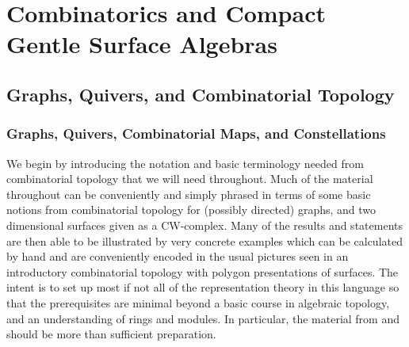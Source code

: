 \documentclass[11pt,oneside]{amsbook}
\numberwithin{equation}{section}
\theoremstyle{plain}
\theoremstyle{definition}
\theoremstyle{remark}
\newenvironment{fullwidth}{\par\noindent}{\par}
\begin{document}
	\begin{fullwidth}
		\part{Combinatorics and Compact Gentle Surface Algebras}
	\end{fullwidth}
	
	\chapter{Graphs, Quivers, and Combinatorial Topology}
	\label{ch:1}
	
	
	\section{Graphs, Quivers, Combinatorial Maps, and Constellations}
	
	\begin{fullwidth}
		We begin by introducing the notation and basic terminology needed from combinatorial topology that we will need throughout. Much of the material throughout can be conveniently and simply phrased in terms of some basic notions from combinatorial topology for (possibly directed) graphs, and two dimensional surfaces given as a CW-complex. Many of the results and statements are then able to be illustrated by very concrete examples which can be calculated by hand and are conveniently encoded in the usual pictures seen in an introductory combinatorial topology with polygon presentations of surfaces. The intent is to set up most if not all of the representation theory in this language so that the prerequisites are minimal beyond a basic course in algebraic topology, and an understanding of rings and modules. In particular, the material from \cite{Kozlov} and \cite{Dummit} should be more than sufficient preparation. 
	\end{fullwidth}
	
\end{document}
